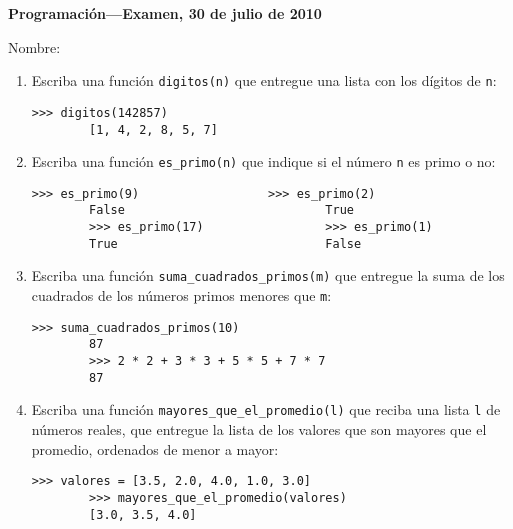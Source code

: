 \documentclass[10pt,spanish]{article}
\newcommand{\onelinerule}{\rule[2.3ex]{0pt}{0pt}}
\newcommand{\nombre}{\framebox[0.9\textwidth]{\onelinerule}}
\newcommand{\li}{\lstinline}
\begin{document}
  \thispagestyle{empty}
  \pagestyle{empty}
  {\Large\bfseries Programación---Examen, 30 de julio de 2010}

  Nombre: \nombre

  \vspace{1ex}
  \begin{enumerate}

    \item
      Escriba una función \li!digitos(n)!
      que entregue una lista con los dígitos de \li!n!:
      \begin{lstlisting}[gobble=8]
        >>> digitos(142857)
        [1, 4, 2, 8, 5, 7]
      \end{lstlisting}

    \vspace{48ex}
        
    \item
      Escriba una función \li!es_primo(n)!
      que indique si el número \li!n! es primo o no:
      \begin{lstlisting}[gobble=8]
        >>> es_primo(9)                  >>> es_primo(2)         
        False                            True                    
        >>> es_primo(17)                 >>> es_primo(1)         
        True                             False                   
      \end{lstlisting}

    \newpage

    \item
      Escriba una función \li!suma_cuadrados_primos(m)!
      que entregue la suma de los cuadrados de los números primos
      menores que \li!m!:
      \begin{lstlisting}[gobble=8]
        >>> suma_cuadrados_primos(10)
        87
        >>> 2 * 2 + 3 * 3 + 5 * 5 + 7 * 7
        87
      \end{lstlisting}

    \vspace{52ex}

    \item 
      Escriba una función \li!mayores_que_el_promedio(l)!
      que reciba una lista \li!l! de números reales,
      que entregue la lista de los valores
      que son mayores que el promedio,
      ordenados de menor a mayor:
      \begin{lstlisting}[gobble=8]
        >>> valores = [3.5, 2.0, 4.0, 1.0, 3.0]
        >>> mayores_que_el_promedio(valores)
        [3.0, 3.5, 4.0]
      \end{lstlisting}


\end{enumerate}
\end{document}
